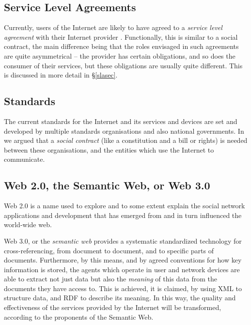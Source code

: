 \fi
\subsection{Service Level Agreements}\label{slasec1}

Currently, users of the Internet are likely to have agreed to a {\em service level
agreement} with their Internet provider \cite{RFCs}. Functionally, this is similar to a social
contract, the main difference being that the roles envisaged in such agreements
are quite asymmetrical -- the provider has certain obligations, and so does the consumer
of their services, but these obligations are usually quite different. This is discussed
in more detail in \S\ref{slasec}.

\subsection{Standards}\label{standards}

The current standards for the Internet and its services and devices 
are set and developed by multiple standards organisations \cite{ietf} %
and also national governments. In \cite{sheniar2021social} we argued that a {\em social contract} 
(like a constitution and a bill or rights) is needed between
these organisations, and the entities which use the Internet to communicate.

\subsection{Web 2.0, the Semantic Web, or Web 3.0}\label{web2}

Web 2.0 \cite{tim2005web} is a name used to explore and to some extent explain
the social network applications and development that has emerged from 
and in turn influenced the world-wide web.


Web 3.0, or the {\em semantic web} \cite{berners2001semantic} provides a
systematic standardized technology for cross-referencing, from document
to document, and to specific parts of documents.  Furthermore, by this
means, and by agreed conventions for how key information is stored,
the agents which operate in user and network devices are able to extract
not just data but also the {\em meaning} of this data from the documents
they have access to.  This is achieved, it is claimed, by using XML to
structure data, and RDF \cite{rdf} to describe its meaning. In this way,
the quality and effectiveness of the services provided by the Internet
will be transformed, according to the proponents of the Semantic Web.

